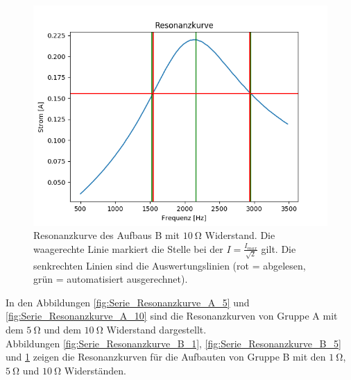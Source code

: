\documentclass[12pt,a4paper]{article}
\begin{document}
\begin{figure}
	\centering
	\includegraphics[scale=0.8]{Bilder/Serie_Resonanzkurve_B_10.png}
	\caption{Resonanzkurve des Aufbaus B mit $\SI{10}{\ohm}$ Widerstand. Die waagerechte Linie markiert die Stelle bei der $I = \frac{I_{max}}{\sqrt{2}}$ gilt. Die senkrechten Linien sind die Auswertungslinien (rot = abgelesen, grün = automatisiert ausgerechnet).}
	\label{fig:Serie_Resonanzkurve_B_10}
\end{figure}



In den Abbildungen \ref{fig:Serie_Resonanzkurve_A_5} und \ref{fig:Serie_Resonanzkurve_A_10} sind die Resonanzkurven von Gruppe A mit dem $\SI{5}{\ohm}$ und dem $\SI{10}{\ohm}$ Widerstand dargestellt. \\
Abbildungen \ref{fig:Serie_Resonanzkurve_B_1}, \ref{fig:Serie_Resonanzkurve_B_5} und \ref{fig:Serie_Resonanzkurve_B_10} zeigen die Resonanzkurven für die Aufbauten von Gruppe B mit den $\SI{1}{\ohm}$, $\SI{5}{\ohm}$ und $\SI{10}{\ohm}$ Widerständen.
\end{document}
